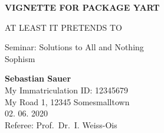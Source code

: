 \documentclass[11pt,ngerman,a4paper,oneside]{article}
\begin{document}


\begin{titlepage}

    \begin{center}
           \begin{figure}
			\centering
			
		\end{figure}

       \vspace*{1cm}

       \LARGE{ \textbf{   \uppercase{Vignette for package yart}   }}


       \large{   \uppercase{At least it pretends to}   }

        \vspace{2cm}

         Seminar: Solutions to All and Nothing \\ 
         \large{Sophism}  \\ 

        \vspace{1cm}

         \textbf{Sebastian Sauer}  \\ 
         My Immatriculation ID: 12345679 \\ 
         My Road 1, 12345 Somesmalltown  \\ 

         \vspace{1cm}
         02. 06. 2020 \\ 

                \vspace{.51cm}
         Referee: Prof.~Dr.~I. Weiss-Ois
         
         \vfill



     \end{center}
    \thispagestyle{empty}
\end{titlepage}

\newpage
\end{document}
